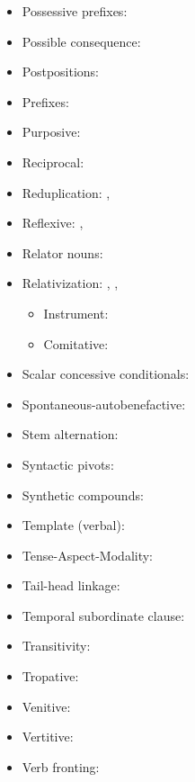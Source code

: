 \documentclass[oldfontcommands,oneside,a4paper,11pt]{article}
\begin{document}
\begin{itemize}
\item Possessive prefixes: \citet[4]{jacques14antipassive}
\item Possible consequence:  \citet[308-311]{jacques14linking}
\item Postpositions:  \citet[272-4]{jacques14linking}
\item Prefixes: \citet[196-199]{jacques13harmonization}
\item Purposive:  \citet[306-8]{jacques14linking}
\item Reciprocal: \citet[212]{jacques12demotion}
\item Reduplication: \citet{jacques04these}, \citet{jacques07redupl}
\item Reflexive: \citet{jacques10refl}, \citet[85]{jacques12agreement}
\item Relator nouns:  \citet[274-6]{jacques14linking}
\item Relativization: \citet{jacques08}, \citet{jacques16relatives},\citet{jacques16sketch}
\begin{itemize}
\item Instrument: \citet{jacques16comparative}
\item Comitative: \citet[272-4]{jacques14linking}
\end{itemize}
\item Scalar concessive conditionals: \citet[300]{jacques14linking}
\item Spontaneous-autobenefactive: \citet{jacques15spontaneous}
\item Stem alternation:  \citet[267]{jacques14linking}
\item Syntactic pivots: \citet{jacques16relatives}
\item Synthetic compounds: \citet[1220-3]{jacques12incorp}
\item Template (verbal): \citet[196-199]{jacques13harmonization}
\item Tense-Aspect-Modality:  \citet[265-9]{jacques14linking}
\item Tail-head linkage:  \citet[279-280]{jacques14linking}
\item Temporal subordinate clause:  \citet[281-295]{jacques14linking}
\item Transitivity: \citet[9-10]{jacques14antipassive}
\item Tropative: \citet{jacques13tropative}
\item Venitive: \citet[200-6]{jacques13harmonization}
\item Vertitive:  \citet{jacques15spontaneous}
\item Verb fronting:  \citet[280]{jacques14linking}
\end{itemize}



\end{document}

